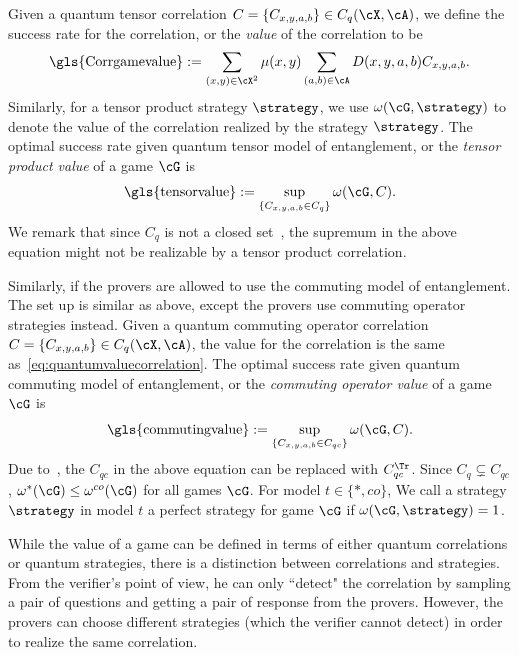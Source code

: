 Given a quantum tensor correlation $C = \{C_{x,y,a,b}\} \in C_q(\cX, \cA)$, we define the success rate for the correlation, or the \textit{value} of the correlation to be 
\begin{equation}\label{eq:quantumvaluecorrelation} 
	\text{\gls{Corrgamevalue}} := \sum_{(x,y) \in \cX^2} \mu(x,y) \sum_{(a,b) \in \cA} D(x,y,a,b) C_{x,y,a,b}. 
\end{equation}
Similarly, for a tensor product strategy $\strategy$, we use $\omega(\cG, \strategy)$ to denote the value of the correlation realized by the strategy $\strategy$. The optimal success rate given quantum tensor model of entanglement, or the \textit{tensor product value} of a game $\cG$ is
\begin{equation}
	\text{\gls{tensorvalue}} := \sup_{\{C_{x,y,a,b} \in C_q \}} \omega(\cG, C).
\end{equation}
We remark that since $C_q$ is not a closed set~\cite{slofstraSetQuantumCorrelation2019}, the supremum in the above equation might not be realizable by a tensor product correlation. 

Similarly, if the provers are allowed to use the commuting model of entanglement. The set up is similar as above, except the provers use commuting operator strategies instead. Given a quantum commuting operator correlation $C = \{C_{x,y,a,b}\} \in C_q(\cX, \cA)$, the value for the correlation is the same as~\eqref{eq:quantumvaluecorrelation}. The optimal success rate given quantum commuting model of entanglement, or the \textit{commuting operator value} of a game $\cG$ is
\begin{equation}
	\text{\gls{commutingvalue}} := \sup_{\{C_{x,y,a,b} \in C_{qc} \}} \omega(\cG, C).
\end{equation}
Due to~, the $C_{qc}$ in the above equation can be replaced with $C_{qc}^{\Tr}$. Since $C_q \subsetneq C_{qc}$, $\omega^*(\cG) \leq \omega^{co}(\cG)$ for all games $\cG$. For model $t \in \{*,co\}$, We call a strategy $\strategy$ in model $t$ a perfect strategy for game $\cG$ if $\omega(\cG, \strategy) = 1$. 

While the value of a game can be defined in terms of either quantum correlations or quantum strategies, there is a distinction between correlations and strategies. From the verifier's point of view, he can only ``detect" the correlation by sampling a pair of questions and getting a pair of response from the provers. However, the provers can choose different strategies (which the verifier cannot detect) in order to realize the same correlation. 


